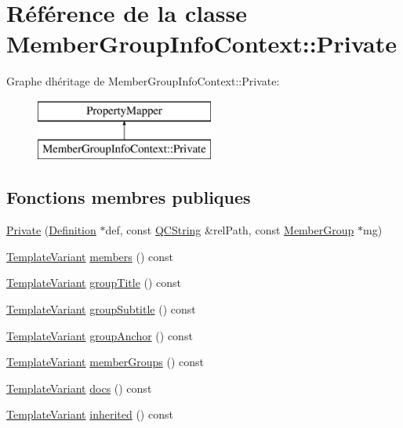 \hypertarget{class_member_group_info_context_1_1_private}{}\section{Référence de la classe Member\+Group\+Info\+Context\+:\+:Private}
\label{class_member_group_info_context_1_1_private}
Graphe d\textquotesingle{}héritage de Member\+Group\+Info\+Context\+:\+:Private\+:\begin{figure}[H]
\begin{center}
\leavevmode
\includegraphics[height=2.000000cm]{class_member_group_info_context_1_1_private}
\end{center}
\end{figure}
\subsection*{Fonctions membres publiques}
\begin{DoxyCompactItemize}
\item 
\hyperlink{class_member_group_info_context_1_1_private_ade6f0ceb787d8b86d489a616721e34e3}{Private} (\hyperlink{class_definition}{Definition} $\ast$def, const \hyperlink{class_q_c_string}{Q\+C\+String} \&rel\+Path, const \hyperlink{class_member_group}{Member\+Group} $\ast$mg)
\item 
\hyperlink{class_template_variant}{Template\+Variant} \hyperlink{class_member_group_info_context_1_1_private_a0372e24927643ab83303ddeebc26cd56}{members} () const 
\item 
\hyperlink{class_template_variant}{Template\+Variant} \hyperlink{class_member_group_info_context_1_1_private_ae135670ee83e4368c294dbc5b4509325}{group\+Title} () const 
\item 
\hyperlink{class_template_variant}{Template\+Variant} \hyperlink{class_member_group_info_context_1_1_private_adba44ee6905490f236e6fabad96f8fb1}{group\+Subtitle} () const 
\item 
\hyperlink{class_template_variant}{Template\+Variant} \hyperlink{class_member_group_info_context_1_1_private_ae8c3f0a61aa90ccd46dcf98bc1f08280}{group\+Anchor} () const 
\item 
\hyperlink{class_template_variant}{Template\+Variant} \hyperlink{class_member_group_info_context_1_1_private_ad9bdeba42a026db732326d5bd6fb395d}{member\+Groups} () const 
\item 
\hyperlink{class_template_variant}{Template\+Variant} \hyperlink{class_member_group_info_context_1_1_private_a1ec99fa87c6fba7dfae9c0b3c3868687}{docs} () const 
\item 
\hyperlink{class_template_variant}{Template\+Variant} \hyperlink{class_member_group_info_context_1_1_private_a79a97d13c13359f58625c2c6b1331dfd}{inherited} () const 
\end{DoxyCompactItemize}


